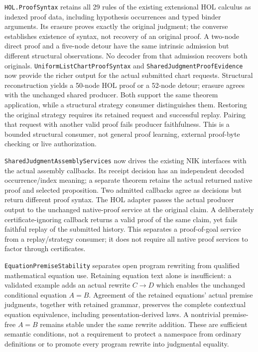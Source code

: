 \documentclass[11pt]{article}
\theoremstyle{definition}
\theoremstyle{remark}
\begin{document}
\nolinkurl{HOL.ProofSyntax} retains all 29 rules of the existing extensional
HOL calculus as indexed proof data, including hypothesis occurrences and
typed binder arguments. Its erasure proves exactly the original judgment;
the converse establishes existence of syntax, not recovery of an original
proof. A two-node direct proof and a five-node detour have the same intrinsic
admission but different structural observations. No decoder from that
admission recovers both originals. \nolinkurl{UniformListChartProofSyntax} and
\nolinkurl{SharedJudgmentProofEvidence} now provide the richer output for the
actual submitted chart requests. Structural reconstruction yields a 50-node
HOL proof or a 52-node detour; erasure agrees with the unchanged shared
producer. Both support the same theorem application, while a structural
strategy consumer distinguishes them. Restoring the original strategy requires
its retained request and successful replay. Pairing that request with another
valid proof fails producer faithfulness. This is a bounded structural consumer,
not general proof learning, external proof-byte checking or live authorization.

\nolinkurl{SharedJudgmentAssemblyServices} now drives the existing NIK
interfaces with the actual assembly callbacks. Its receipt decision has an
independent decoded occurrence/index meaning; a separate theorem retains the
actual returned native proof and selected proposition. Two admitted callbacks
agree as decisions but return different proof syntax. The HOL adapter passes
the actual producer output to the unchanged native-proof service at the
original claim. A deliberately certificate-ignoring callback returns a valid
proof of the same claim, yet fails faithful replay of the submitted history.
This separates a proof-of-goal service from a replay/strategy consumer; it
does not require all native proof services to factor through certificates.

\nolinkurl{EquationPremiseStability} separates open program rewriting from
qualified mathematical equation use. Retaining equation text alone is
insufficient: a validated example adds an actual rewrite $C\to D$ which
enables the unchanged conditional equation $A=B$. Agreement of the retained
equations' actual premise judgments, together with retained grammar, preserves
the complete contextual equation equivalence, including presentation-derived
laws. A nontrivial premise-free $A=B$ remains stable under the same rewrite
addition. These are sufficient semantic conditions, not a requirement to
protect a namespace from ordinary definitions or to promote every program
rewrite into judgmental equality.
\end{document}

